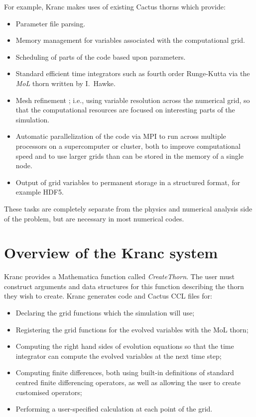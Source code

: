 \documentclass{report}
\begin{document}
For example, Kranc makes uses of existing Cactus thorns which provide:
\begin{itemize}
\item Parameter file parsing.
\item Memory management for variables associated with the
computational grid.
\item Scheduling of parts of the code based upon parameters.
\item Standard efficient time integrators such as fourth order
  Runge-Kutta via the {\em MoL} thorn written by I.~Hawke.
\item Mesh refinement \cite{Schnetter}; i.e., using variable resolution
across the numerical grid, so that the computational resources are
focused on interesting parts of the simulation.
\item Automatic parallelization of the code via MPI to run across multiple
processors on a supercomputer or cluster, both to improve
computational speed and to use larger grids than can be stored in the
memory of a single node.
\item Output of grid variables to permanent storage in a structured
format, for example HDF5.
\end{itemize}
These tasks are completely separate from the physics and numerical
analysis side of the problem, but are necessary in most numerical
codes.

\section{Overview of the Kranc system}

Kranc provides a Mathematica function called {\em CreateThorn}.  The
user must construct arguments and data structures for this function
describing the thorn they wish to create.  Kranc generates code and
Cactus CCL files for:

\begin{itemize}
\item Declaring the grid functions which the simulation will use;
\item Registering the grid functions for the evolved variables with
  the MoL thorn;
\item Computing the right hand sides of evolution equations so that the
time integrator can compute the evolved variables at the next time
step;
\item Computing finite differences, both using built-in definitions of
  standard centred finite differencing operators, as well as allowing
  the user to create customised operators;
\item Performing a user-specified calculation at each point of the grid.
\end{itemize}
\end{document}
